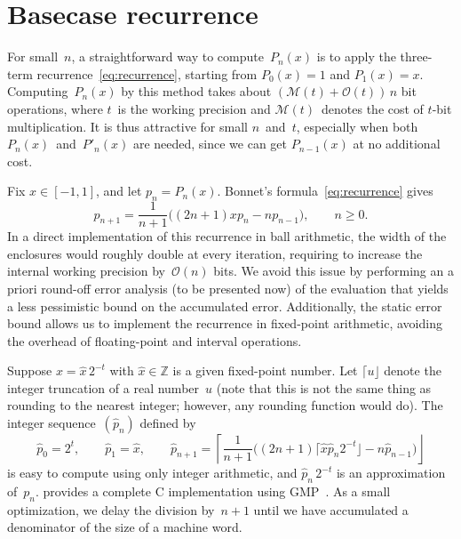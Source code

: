 \documentclass[nohypdvips,review]{siamart0216}
\newcommand{\OO}{\mathcal{O}}
\newcommand{\MM}{\mathcal{M}}
\begin{document}
\section{Basecase recurrence}

\label{sec:recurrence}

For small $n$, a straightforward way to compute~$P_n(x)$ is to apply
the three-term recurrence \cref{eq:recurrence},
starting from $P_0(x)=1$ and ${P_1(x) = x}$.
Computing~$P_n(x)$ by this method takes about $(\MM(t) + \OO(t))\, n$
bit operations, where $t$ is the working precision and $\MM(t)$ denotes the
cost of $t$-bit multiplication.
It is thus attractive for small $n$ and $t$, especially when both
$P_n(x)$ and $P'_n(x)$ are needed, since we can get $P_{n-1}(x)$ at no
additional cost.

Fix $x \in [-1, 1]$, and let $p_n = P_n(x)$.
Bonnet's formula~\cref{eq:recurrence} gives
\begin{equation} \label{eq:rec-bis}
  p_{n + 1} =
    \frac{1}{n+1}
    \bigl( (2n +1) x p_n - n p_{n-1} \bigr),
  \qquad n \geq 0.
\end{equation}
In a direct implementation of this recurrence in ball arithmetic, the
width of the enclosures would roughly double at every iteration,
requiring to increase the internal working precision by $\OO(n)$ bits.
We avoid this issue by performing an a priori round-off error
analysis (to be presented now) of the evaluation that yields a less
pessimistic bound on the accumulated error.
Additionally, the static error bound allows us to implement the
recurrence in fixed-point arithmetic, avoiding the overhead of
floating-point and interval operations.

Suppose $x = \hat x \, 2^{-t}$ with $\hat x \in \mathbb Z$
is a given fixed-point number.
Let $\lceil u \rfloor$ denote the integer truncation of a real
number~$u$ (note that this is not the same thing as rounding to the nearest
integer; however, any rounding function would do).
The integer sequence $(\hat p_n)$ defined by
\begin{equation} \label{eq:rec-fxpt}
  \hat{p}_0 = 2^t, \qquad
  \hat{p}_1 = \hat x, \qquad
  \hat{p}_{n + 1} =
    \left\lceil \frac{1}{n + 1}  \bigl( (2 n + 1) \lceil \hat{x}
      \hat{p}_n 2^{- t} \rfloor - n \hat{p}_{n - 1} \bigr)
    \right\rfloor
\end{equation}
is easy to compute using only integer arithmetic, and
$\hat p_n \, 2^{-t}$ is an approximation of~$p_n$.
 provides a complete C implementation
using GMP~\cite{granlund2017}.
As a small optimization, we delay the division by~$n+1$ until we have
accumulated a denominator of the size of a machine word.
\end{document}
